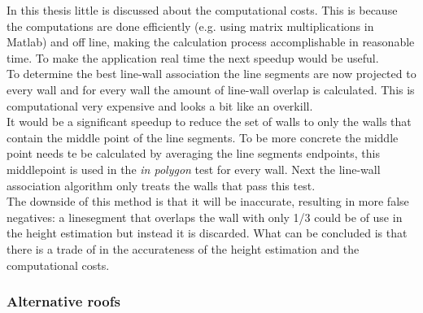 \documentclass[10pt]{article}
\begin{document}
{In this thesis little is discussed about the computational costs. This is
because the computations are done efficiently (e.g. using matrix multiplications
in Matlab) and off line, making the calculation process accomplishable in reasonable time.
To make the application real time the next speedup would be useful.\\
To determine the best line-wall association the line segments are now projected to
every wall and for every wall the amount of line-wall overlap is calculated. This
is computational very expensive and looks a bit like an overkill.\\
It would be a significant speedup to reduce the set of walls to only the walls
that contain the middle point of the line segments. To be more concrete the
middle point needs te be calculated by averaging the line segments endpoints,
this middlepoint is used in the \emph{in polygon} test for every wall.  Next the
line-wall association algorithm only treats the walls that pass this test.\\
The downside of this method is that it will be inaccurate, resulting in more false
negatives: a linesegment that overlaps the wall with only 1/3 could be of
use in the height estimation but instead it is discarded.
What can be concluded is that there is a trade of in the accurateness of the
height estimation and the computational costs.


\subsubsection{Alternative roofs}


}
\end{document}
